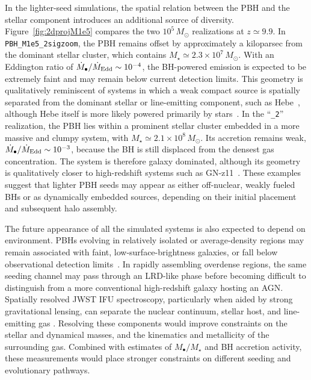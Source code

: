 \documentclass[twocolumn,trackchanges]{aastex701}
\begin{document}
In the lighter-seed simulations, the spatial relation between the PBH and the stellar component introduces an additional source of diversity. Figure~\ref{fig:2dprojM1e5} compares the two $10^5\,M_\odot$ realizations at $z\simeq9.9$. In \texttt{PBH\_M1e5\_2sigzoom}, the PBH remains offset by approximately a kiloparsec from the dominant stellar cluster, which contains $M_\star\simeq2.3\times10^7\,M_\odot$. With an Eddington ratio of $\dot{M}_\bullet/\dot{M}_{\rm Edd}\sim10^{-4}$, the BH-powered emission is expected to be extremely faint and may remain below current detection limits. This geometry is qualitatively reminiscent of systems in which a weak compact source is spatially separated from the dominant stellar or line-emitting component, such as Hebe~\citep{MaiolinoHebe2026arXiv,UblerHebe2026arXiv}, although Hebe itself is more likely powered primarily by stars~\citep{JeonHebe2026ApJ,RustaHebe2026}. In the ``\texttt{\_2}'' realization, the PBH lies within a prominent stellar cluster embedded in a more massive and clumpy system, with $M_\star\simeq2.1\times10^8\,M_\odot$. Its accretion remains weak,
$\dot{M}_\bullet/\dot{M}_{\rm Edd}\sim10^{-3}$, because the BH is still displaced from the densest gas concentration. The system is therefore galaxy dominated, although its geometry is qualitatively closer to high-redshift systems such as GN-z11~\citep{Scholtz2024A&A}. These examples suggest that lighter PBH seeds may appear as either off-nuclear, weakly fueled BHs or as dynamically embedded sources, depending on their initial placement and subsequent halo assembly.

The future appearance of all the simulated systems is also expected to depend on environment. PBHs evolving in relatively isolated or average-density regions may remain associated with faint, low-surface-brightness galaxies, or fall below observational detection limits~\citep{ZhangPBHGalaxy2025ApJ, Dayal2026arXiv260420966D}. In rapidly assembling overdense regions, the same seeding channel may pass through an LRD-like phase before becoming difficult to distinguish from a more conventional high-redshift galaxy hosting an AGN. Spatially resolved JWST IFU spectroscopy, particularly when aided by strong gravitational lensing, can separate the nuclear continuum, stellar host, and line-emitting gas \citep[see, e.g.,][]{QSO1Direct2026Natur,GolubchikVENUS2026A&A, GLIMPSEBH2026ApJ}. Resolving these components would improve constraints on the stellar and dynamical masses, and the kinematics and metallicity of the surrounding gas. Combined with estimates of $M_\bullet/M_\star$ and BH accretion activity, these measurements would place stronger constraints on different seeding and evolutionary pathways.
\end{document}
